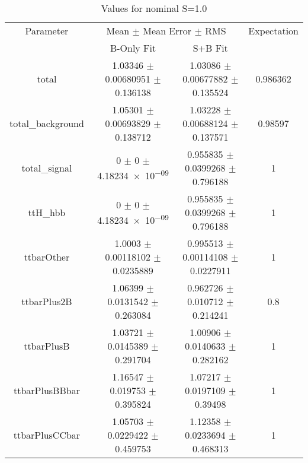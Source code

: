 \begin{table}
\centering
\caption{Values for nominal S=1.0}
\begin{tabular}{cccc}
\toprule
Parameter & \multicolumn{2}{c}{Mean $\pm$ Mean Error $\pm$ RMS} & Expectation\\
 & B-Only Fit & S+B Fit & \\
\midrule
total & \num{1.03346} $\pm$ \num{0.00680951} $\pm$ \num{0.136138} & \num{1.03086} $\pm$ \num{0.00677882} $\pm$ \num{0.135524} & \num{0.986362}\\
total\_background & \num{1.05301} $\pm$ \num{0.00693829} $\pm$ \num{0.138712} & \num{1.03228} $\pm$ \num{0.00688124} $\pm$ \num{0.137571} & \num{0.98597}\\
total\_signal & \num{0} $\pm$ \num{0} $\pm$ \num{4.18234e-09} & \num{0.955835} $\pm$ \num{0.0399268} $\pm$ \num{0.796188} & \num{1}\\
ttH\_hbb & \num{0} $\pm$ \num{0} $\pm$ \num{4.18234e-09} & \num{0.955835} $\pm$ \num{0.0399268} $\pm$ \num{0.796188} & \num{1}\\
ttbarOther & \num{1.0003} $\pm$ \num{0.00118102} $\pm$ \num{0.0235889} & \num{0.995513} $\pm$ \num{0.00114108} $\pm$ \num{0.0227911} & \num{1}\\
ttbarPlus2B & \num{1.06399} $\pm$ \num{0.0131542} $\pm$ \num{0.263084} & \num{0.962726} $\pm$ \num{0.010712} $\pm$ \num{0.214241} & \num{0.8}\\
ttbarPlusB & \num{1.03721} $\pm$ \num{0.0145389} $\pm$ \num{0.291704} & \num{1.00906} $\pm$ \num{0.0140633} $\pm$ \num{0.282162} & \num{1}\\
ttbarPlusBBbar & \num{1.16547} $\pm$ \num{0.019753} $\pm$ \num{0.395824} & \num{1.07217} $\pm$ \num{0.0197109} $\pm$ \num{0.39498} & \num{1}\\
ttbarPlusCCbar & \num{1.05703} $\pm$ \num{0.0229422} $\pm$ \num{0.459753} & \num{1.12358} $\pm$ \num{0.0233694} $\pm$ \num{0.468313} & \num{1}\\
\bottomrule
\end{tabular}
\end{table}
